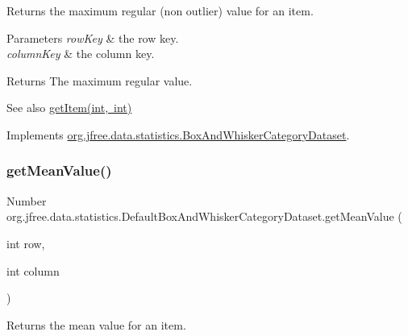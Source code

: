 Returns the maximum regular (non outlier) value for an item.


\begin{DoxyParams}{Parameters}
{\em row\+Key} & the row key. \\
\hline
{\em column\+Key} & the column key.\\
\hline
\end{DoxyParams}
\begin{DoxyReturn}{Returns}
The maximum regular value.
\end{DoxyReturn}
\begin{DoxySeeAlso}{See also}
\mbox{\hyperlink{classorg_1_1jfree_1_1data_1_1statistics_1_1_default_box_and_whisker_category_dataset_a85c944b06e4337059ea728b3a744e2a9}{get\+Item(int, int)}} 
\end{DoxySeeAlso}


Implements \mbox{\hyperlink{interfaceorg_1_1jfree_1_1data_1_1statistics_1_1_box_and_whisker_category_dataset_ae4cff365d11652710865d02e47b81aba}{org.\+jfree.\+data.\+statistics.\+Box\+And\+Whisker\+Category\+Dataset}}.

\mbox{\label{classorg_1_1jfree_1_1data_1_1statistics_1_1_default_box_and_whisker_category_dataset_a700a1e0b318bce923ba3db9a69be337c}} 
\subsubsection{\texorpdfstring{get\+Mean\+Value()}{getMeanValue()}\hspace{0.1cm}{\footnotesize\ttfamily [1/2]}}
{\footnotesize\ttfamily Number org.\+jfree.\+data.\+statistics.\+Default\+Box\+And\+Whisker\+Category\+Dataset.\+get\+Mean\+Value (\begin{DoxyParamCaption}\item[{int}]{row,  }\item[{int}]{column }\end{DoxyParamCaption})}

Returns the mean value for an item.


